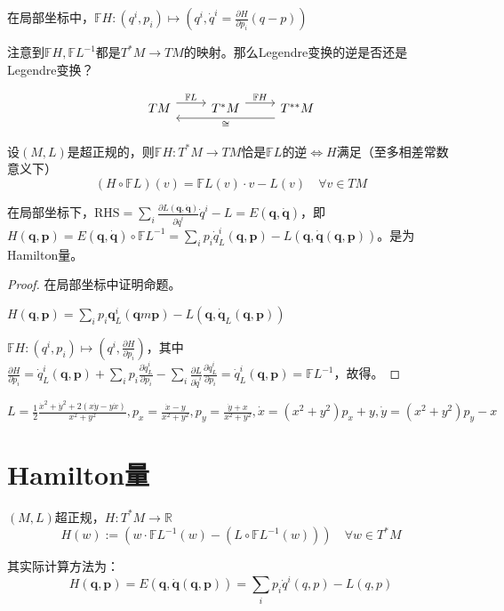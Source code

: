 \documentclass{ctexbook}
\begin{document}
在局部坐标中，$\mathbb{F}H:(q^i, p_i)\mapsto (q^i, \dot{q}^i=\frac{\partial H}{\partial p_{i}}(q-p))$

注意到$\mathbb{F}H, \mathbb{F}L^{-1}$都是$T^{*}M\to TM$的映射。那么Legendre变换的逆是否还是Legendre变换？


\[
  \begin{tikzcd}
TM \arrow[r, "\mathbb{F}L", shift left=2] & T^*M \arrow[r, "\mathbb{F}H", shift left=2] & T^{**}M \arrow[ll, "\cong", shift left=3]
\end{tikzcd}\]

\begin{Prop}
  设$(M,L)$是超正规的，则$\mathbb{F}H:T^{*}M\to TM$恰是$\mathbb{F}L$的逆$\Leftrightarrow H$满足（至多相差常数意义下）
  \begin{equation*}
(H\circ \mathbb{F}L)(v)=\mathbb{F}L(v)\cdot v- L(v) \quad \forall v\in TM
  \end{equation*}
\end{Prop}
在局部坐标下，$\mathrm{RHS}=\sum\limits_{i}^{}\frac{\partial L(\bm{q}, \bm{\dot{q}})}{\partial \dot{q}^{i}}\dot{q}^i-L=E(\bm{q},\bm{\dot{q}})$，即$H(\bm{q}, \bm{p})= E(\bm{q}, \bm{\dot{q}})\circ \mathbb{F}L^{-1}=\sum\limits_i^{}p_i \dot{q}^i_L(\bm{q}, \bm{p})-L(\bm{q}, \bm{\dot{q}}(\bm{q},\bm{p}))$。是为Hamilton量。

\begin{proof}
  在局部坐标中证明命题。

  $H(\bm{q}, \bm{p})= \sum\limits_i^{}p_i\bm{q}^{i}_L(\bm{q}m\bm{p})- L(\bm{q}, \bm{\dot{q}}_L(\bm{q}, \bm{p}))$

  $\mathbb{F}H:(q^i,p_i)\mapsto (q^i, \frac{\partial H}{\partial p_{i}})$，其中$\frac{\partial H}{\partial p_i}= \dot{q}^i_L(\bm{q},\bm{p})+\sum\limits_i^{}p_i \frac{\partial \dot{q}^{i}_L}{\partial p_i}-\sum\limits_i^{}\frac{\partial L}{\partial \dot{q}^{i}}\frac{\partial \dot{q}^{i}_L}{\partial p_i}= \dot{q}^i_L(\bm{q},\bm{p})=\mathbb{F}L^{-1}$，故得。
\end{proof}

\begin{Eg}
  $L= \frac{1}{2}\frac{\dot{x}^2+\dot{y}^2+2(x\dot{y}-y\dot{x})}{x^2+y^2}, p_x=\frac{\dot{x}-y}{x^2+y^2}, p_y=\frac{\dot{y}+x}{x^2+y^2}, \dot{x}=(x^2+y^2)p_x+y, \dot{y}=(x^2+y^2)p_y-x$
\end{Eg}

\section{Hamilton量}
\begin{Def}[Hamilton量]
  $(M,L)$超正规，$H:T^{*}M\to \mathbb{R}$
  \begin{equation*}
H(w):=(w\cdot \mathbb{F}L^{-1}(w)-(L\circ \mathbb{F}L^{-1}(w))) \quad \forall w\in T^{*}M
  \end{equation*}
\end{Def}
其实际计算方法为：
\begin{equation*}
H(\bm{q},\bm{p})=E(\bm{q}, \dot{\bm{q}}(\bm{q},\bm{p}))=\sum_i p_i\dot{q}^i(q,p)-L(q,p)
\end{equation*}
\end{document}
